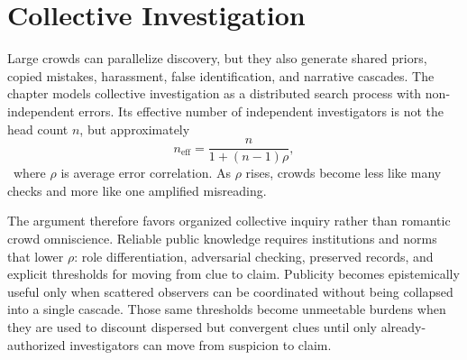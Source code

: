
\chapter{Collective Investigation}
\label{ch:ch028}

Large crowds can parallelize discovery, but they also generate shared priors, copied mistakes, harassment, false identification, and narrative cascades. The chapter models collective investigation as a distributed search process with non-independent errors. Its effective number of independent investigators is not the head count \(n\), but approximately
\[
n_{\mathrm{eff}} = \frac{n}{1+(n-1)\rho},
\]
\ToyModel\ where \(\rho\) is average error correlation. As \(\rho\) rises, crowds become less like many checks and more like one amplified misreading.

The argument therefore favors organized collective inquiry rather than romantic crowd omniscience. Reliable public knowledge requires institutions and norms that lower \(\rho\): role differentiation, adversarial checking, preserved records, and explicit thresholds for moving from clue to claim. Publicity becomes epistemically useful only when scattered observers can be coordinated without being collapsed into a single cascade. Those same thresholds become unmeetable burdens when they are used to discount dispersed but convergent clues until only already-authorized investigators can move from suspicion to claim.
